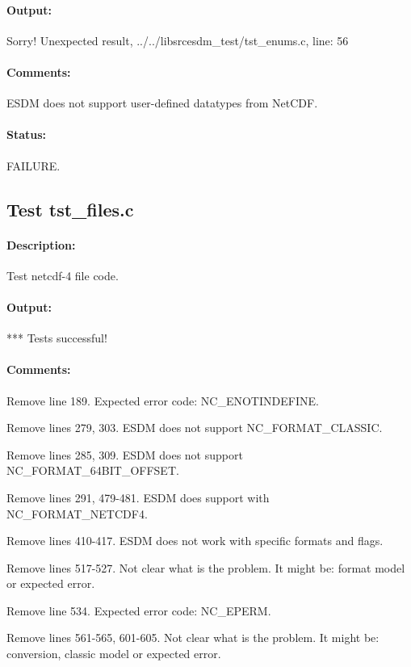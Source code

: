 \paragraph{Output:} Sorry! Unexpected result, ../../libsrcesdm\_test/tst\_enums.c, line: 56

\paragraph{Comments:} ESDM does not support user-defined datatypes from NetCDF.

\paragraph{Status:} FAILURE.

\subsection{Test tst\_files.c}

\paragraph{Description:} Test netcdf-4 file code.

\paragraph{Output:} *** Tests successful!

\paragraph{Comments:}

Remove line 189. Expected error code: NC\_ENOTINDEFINE.

Remove lines 279, 303. ESDM does not support NC\_FORMAT\_CLASSIC.

Remove lines 285, 309. ESDM does not support NC\_FORMAT\_64BIT\_OFFSET.

Remove lines 291, 479-481. ESDM does support with NC\_FORMAT\_NETCDF4.

Remove lines 410-417. ESDM does not work with specific formats and flags.

Remove lines 517-527. Not clear what is the problem. It might be: format model or expected error.

Remove line 534. Expected error code: NC\_EPERM.

Remove lines 561-565, 601-605. Not clear what is the problem. It might be: conversion, classic model or expected error.

